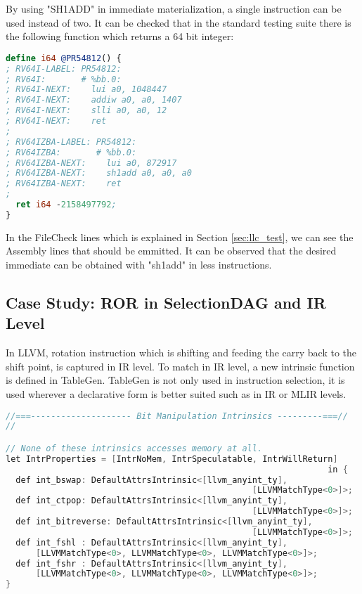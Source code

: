 By using "SH1ADD" in immediate materialization, a single instruction can be used instead of two. It can be checked that in the standard testing suite there is the following function which returns a 64 bit integer:
\begin{minipage}{\linewidth}
\begin{lstlisting}[language=llvm,style=nasm, caption={Function for Immediate Materialisation}]
define i64 @PR54812() {
; RV64I-LABEL: PR54812:
; RV64I:       # %bb.0:
; RV64I-NEXT:    lui a0, 1048447
; RV64I-NEXT:    addiw a0, a0, 1407
; RV64I-NEXT:    slli a0, a0, 12
; RV64I-NEXT:    ret
;
; RV64IZBA-LABEL: PR54812:
; RV64IZBA:       # %bb.0:
; RV64IZBA-NEXT:    lui a0, 872917
; RV64IZBA-NEXT:    sh1add a0, a0, a0
; RV64IZBA-NEXT:    ret
;
  ret i64 -2158497792;
}
\end{lstlisting}
\end{minipage}
In the FileCheck lines which is explained in Section \ref{sec:llc_test}, we can see the Assembly lines that should be emmitted. It can be observed that the desired immediate can be obtained with "sh1add" in less instructions.

\subsection{Case Study: ROR in SelectionDAG and IR Level}

In LLVM, rotation instruction which is shifting and feeding the carry back to the shift point, is captured in IR level. To match in IR level, a new intrinsic function is defined in TableGen. TableGen is not only used in instruction selection, it is used wherever a declarative form is better suited such as in IR or MLIR levels.

\begin{lstlisting}[language=C++, caption={Funnel Shift Intrinsic Definition}]
//===-------------------- Bit Manipulation Intrinsics ---------===//
//

// None of these intrinsics accesses memory at all.
let IntrProperties = [IntrNoMem, IntrSpeculatable, IntrWillReturn]
                                                                in {
  def int_bswap: DefaultAttrsIntrinsic<[llvm_anyint_ty],
                                                 [LLVMMatchType<0>]>;
  def int_ctpop: DefaultAttrsIntrinsic<[llvm_anyint_ty],
                                                 [LLVMMatchType<0>]>;
  def int_bitreverse: DefaultAttrsIntrinsic<[llvm_anyint_ty],
                                                 [LLVMMatchType<0>]>;
  def int_fshl : DefaultAttrsIntrinsic<[llvm_anyint_ty],
      [LLVMMatchType<0>, LLVMMatchType<0>, LLVMMatchType<0>]>;
  def int_fshr : DefaultAttrsIntrinsic<[llvm_anyint_ty],
      [LLVMMatchType<0>, LLVMMatchType<0>, LLVMMatchType<0>]>;
}
\end{lstlisting}

